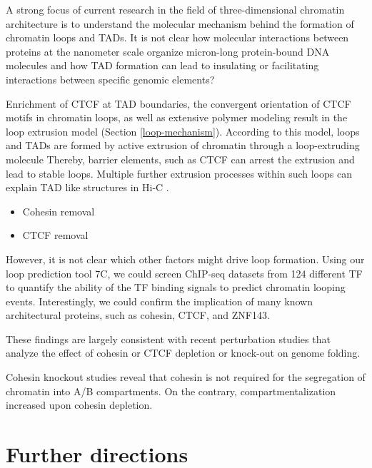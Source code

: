\documentclass[a4paper,twoside=true,openright,parskip=full,chapterprefix=true,11pt,headings=normal,bibliography=totoc,listof=totoc,titlepage=on,captions=tableabove,draft=false]{scrreprt}
\providecommand{\tightlist}{%
  \setlength{\itemsep}{0pt}\setlength{\parskip}{0pt}}
\theoremstyle{definition}
\theoremstyle{definition}
\theoremstyle{definition}
\theoremstyle{remark}
\begin{document}
A strong focus of current research in the field of three-dimensional
chromatin architecture is to understand the molecular mechanism behind
the formation of chromatin loops and TADs. It is not clear how molecular
interactions between proteins at the nanometer scale organize
micron-long protein-bound DNA molecules and how TAD formation can lead
to insulating or facilitating interactions between specific genomic
elements?

Enrichment of CTCF at TAD boundaries, the convergent orientation of CTCF
motifs in chromatin loops, as well as extensive polymer modeling result
in the loop extrusion model (Section \ref{loop-mechanism}). According to
this model, loops and TADs are formed by active extrusion of chromatin
through a loop-extruding molecule Thereby, barrier elements, such as
CTCF can arrest the extrusion and lead to stable loops. Multiple further
extrusion processes within such loops can explain TAD like structures in
Hi-C \citep{Fudenberg2018}.

\begin{itemize}
\tightlist
\item
  Cohesin removal \citep{Schwarzer2016}
\item
  CTCF removal \citep{Rao2017}
\end{itemize}

However, it is not clear which other factors might drive loop formation.
Using our loop prediction tool 7C, we could screen ChIP-seq datasets
from 124 different TF to quantify the ability of the TF binding signals
to predict chromatin looping events. Interestingly, we could confirm the
implication of many known architectural proteins, such as cohesin, CTCF,
and ZNF143.

These findings are largely consistent with recent perturbation studies
that analyze the effect of cohesin or CTCF depletion or knock-out on
genome folding.

Cohesin knockout studies reveal that cohesin is not required for the
segregation of chromatin into A/B compartments. On the contrary,
compartmentalization increased upon cohesin depletion.

\hypertarget{further-directions}{%
\section{Further directions}\label{further-directions}}
\end{document}

